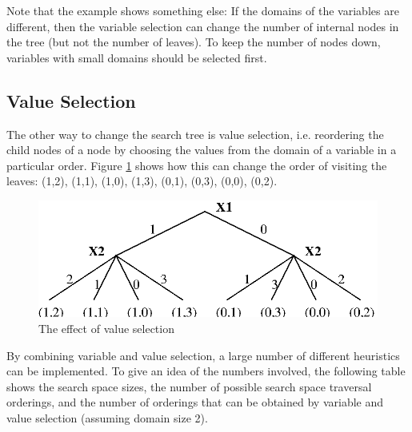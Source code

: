 Note that the example shows something else: If the domains of the variables
are different, then the variable selection can change the number of internal
nodes in the tree (but not the number of leaves). To keep the number of nodes
down, variables with small domains should be selected first.


\subsection{Value Selection}

The other way to change the search tree is value selection, i.e. reordering
the child nodes of a node by choosing the 
values from the domain of a variable in a particular order.
Figure \ref{figvalsel} shows how this can change the order of visiting the
leaves:
(1,2), (1,1), (1,0), (1,3), (0,1), (0,3), (0,0), (0,2).

\begin{figure}
\begin{center}
\includegraphics{search2.eps}
\end{center}
\caption{The effect of value selection}
\label{figvalsel}
\end{figure}

By combining variable and value selection, a large number of different
heuristics can be implemented.
To give an idea of the numbers involved, the following table shows the search
space sizes, the number of possible search space traversal orderings,
and the number of orderings
that can be obtained by variable and value selection (assuming domain size 2).

